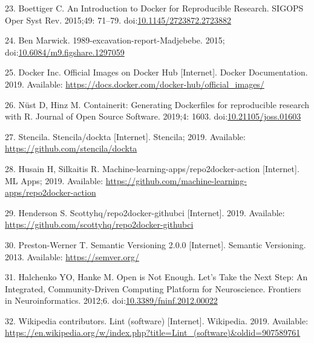 \documentclass[10pt,letterpaper]{article}
\begin{document}
\leavevmode\hypertarget{ref-boettiger_introduction_2015}{}%
23. Boettiger C. An Introduction to Docker for Reproducible Research.
SIGOPS Oper Syst Rev. 2015;49: 71--79.
doi:\href{https://doi.org/10.1145/2723872.2723882}{10.1145/2723872.2723882}

\leavevmode\hypertarget{ref-marwick_madjebebe_2015}{}%
24. Ben Marwick. 1989-excavation-report-Madjebebe. 2015;
doi:\href{https://doi.org/10.6084/m9.figshare.1297059}{10.6084/m9.figshare.1297059}

\leavevmode\hypertarget{ref-docker_inc_official_2019}{}%
25. Docker Inc. Official Images on Docker Hub {[}Internet{]}. Docker
Documentation. 2019. Available:
\url{https://docs.docker.com/docker-hub/official_images/}

\leavevmode\hypertarget{ref-nust_containerit_2019}{}%
26. Nüst D, Hinz M. Containerit: Generating Dockerfiles for reproducible
research with R. Journal of Open Source Software. 2019;4: 1603.
doi:\href{https://doi.org/10.21105/joss.01603}{10.21105/joss.01603}

\leavevmode\hypertarget{ref-stencila_dockta_2019}{}%
27. Stencila. Stencila/dockta {[}Internet{]}. Stencila; 2019. Available:
\url{https://github.com/stencila/dockta}

\leavevmode\hypertarget{ref-husain_repo2docker-action_2019}{}%
28. Husain H, Silkaitis R. Machine-learning-apps/repo2docker-action
{[}Internet{]}. ML Apps; 2019. Available:
\url{https://github.com/machine-learning-apps/repo2docker-action}

\leavevmode\hypertarget{ref-scottyhq_repo2docker-githubci_2019}{}%
29. Henderson S. Scottyhq/repo2docker-githubci {[}Internet{]}. 2019.
Available: \url{https://github.com/scottyhq/repo2docker-githubci}

\leavevmode\hypertarget{ref-preston-werner_semantic_2013}{}%
30. Preston-Werner T. Semantic Versioning 2.0.0 {[}Internet{]}. Semantic
Versioning. 2013. Available: \url{https://semver.org/}

\leavevmode\hypertarget{ref-halchenko_open_2012}{}%
31. Halchenko YO, Hanke M. Open is Not Enough. Let's Take the Next Step:
An Integrated, Community-Driven Computing Platform for Neuroscience.
Frontiers in Neuroinformatics. 2012;6.
doi:\href{https://doi.org/10.3389/fninf.2012.00022}{10.3389/fninf.2012.00022}

\leavevmode\hypertarget{ref-wikipedia_contributors_lint_2019}{}%
32. Wikipedia contributors. Lint (software) {[}Internet{]}. Wikipedia.
2019. Available:
\url{https://en.wikipedia.org/w/index.php?title=Lint_(software)\&oldid=907589761}
\end{document}

